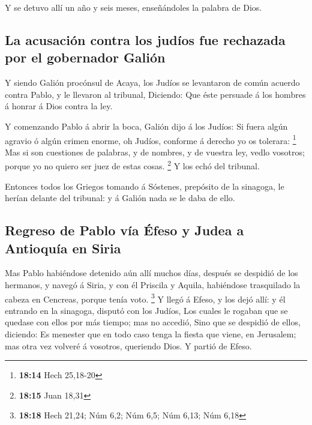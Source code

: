  Y se detuvo allí un año y seis meses, enseñándoles la
palabra de Dios.

\hypertarget{la-acusaciuxf3n-contra-los-juduxedos-fue-rechazada-por-el-gobernador-galiuxf3n}{%
\subsection{La acusación contra los judíos fue rechazada por el
gobernador
Galión}\label{la-acusaciuxf3n-contra-los-juduxedos-fue-rechazada-por-el-gobernador-galiuxf3n}}

 Y siendo Galión procónsul de Acaya, los Judíos se
levantaron de común acuerdo contra Pablo, y le llevaron al tribunal,
 Diciendo: Que éste persuade á los hombres á honrar á
Dios contra la ley.

 Y comenzando Pablo á abrir la boca, Galión dijo á los
Judíos: Si fuera algún agravio ó algún crimen enorme, oh Judíos,
conforme á derecho yo os tolerara: \footnote{\textbf{18:14} Hech
  25,18-20}  Mas si son cuestiones de palabras, y de
nombres, y de vuestra ley, vedlo vosotros; porque yo no quiero ser juez
de estas cosas. \footnote{\textbf{18:15} Juan 18,31}  Y
los echó del tribunal.

 Entonces todos los Griegos tomando á Sóstenes, prepósito
de la sinagoga, le herían delante del tribunal: y á Galión nada se le
daba de ello.

\hypertarget{regreso-de-pablo-vuxeda-uxe9feso-y-judea-a-antioquuxeda-en-siria}{%
\subsection{Regreso de Pablo vía Éfeso y Judea a Antioquía en
Siria}\label{regreso-de-pablo-vuxeda-uxe9feso-y-judea-a-antioquuxeda-en-siria}}

 Mas Pablo habiéndose detenido aún allí muchos días,
después se despidió de los hermanos, y navegó á Siria, y con él Priscila
y Aquila, habiéndose trasquilado la cabeza en Cencreas, porque tenía
voto. \footnote{\textbf{18:18} Hech 21,24; Núm 6,2; Núm 6,5; Núm 6,13;
  Núm 6,18}  Y llegó á Efeso, y los dejó allí: y él
entrando en la sinagoga, disputó con los Judíos,  Los
cuales le rogaban que se quedase con ellos por más tiempo; mas no
accedió,  Sino que se despidió de ellos, diciendo: Es
menester que en todo caso tenga la fiesta que viene, en Jerusalem; mas
otra vez volveré á vosotros, queriendo Dios. Y partió de Efeso.

